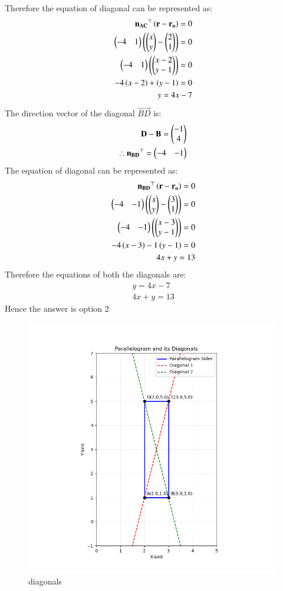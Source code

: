 \documentclass[journal]{IEEEtran}
\theoremstyle{remark}
\begin{document}
Therefore the equation of diagonal can be represented as:
\begin{align}
    \mathbf{n_{AC}}^{\top}\left(\mathbf{r}-\mathbf{r_o}\right)=0\\
    \begin{pmatrix}-4&1\end{pmatrix}\left(\begin{pmatrix}x\\y\end{pmatrix}-\begin{pmatrix}2\\1\end{pmatrix}\right)=0\\
    \begin{pmatrix}-4&1\end{pmatrix}\left(\begin{pmatrix}x-2\\y-1\end{pmatrix}\right)=0\\
    -4\left(x-2\right)+\left(y-1\right)=0\\
    y=4x-7
\end{align}
The direction vector of the diagonal $\vec{BD}$ is:
\begin{align}
    \mathbf{D}-\mathbf{B}=\begin{pmatrix}-1\\4\end{pmatrix}\\
    \therefore \mathbf{n_{BD}}^{\top}=\begin{pmatrix}-4&-1\end{pmatrix}
\end{align}
The equation of diagonal can be represented as:
\begin{align}
        \mathbf{n_{BD}}^{\top}\left(\mathbf{r}-\mathbf{r_o}\right)=0\\
        \begin{pmatrix}-4&-1\end{pmatrix}\left(\begin{pmatrix}x\\y\end{pmatrix}-\begin{pmatrix}3\\1\end{pmatrix}\right)=0\\
        \begin{pmatrix}-4&-1\end{pmatrix}\left(\begin{pmatrix}x-3\\y-1\end{pmatrix}\right)=0\\
        -4\left(x-3\right)-1\left(y-1\right)=0\\
        4x+y=13
\end{align}
Therefore the equations of both the diagonals are:
\begin{align}
    y=4x-7\\4x+y=13
\end{align}
Hence the answer is option 2

\begin{figure}[H]
    \centering
    \includegraphics[width=0.9\columnwidth]{figs/diagonals.png}
    \caption{diagonals}
    \label{fig:placeholder_1}
\end{figure}
\end{document}
